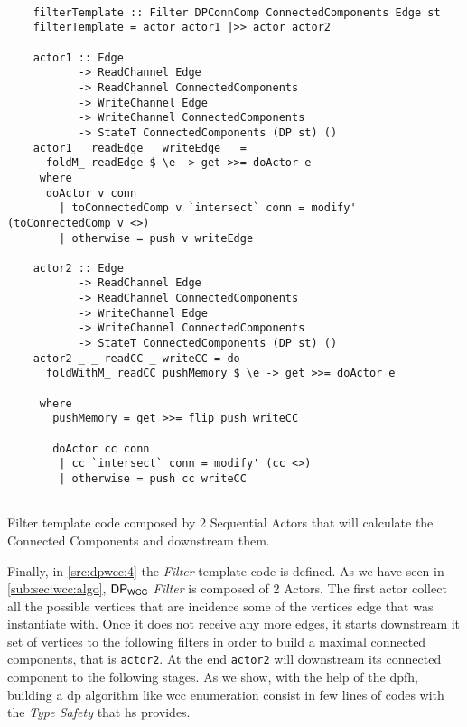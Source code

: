 \begin{listing}[H]
  \begin{verbatim}
    
    filterTemplate :: Filter DPConnComp ConnectedComponents Edge st
    filterTemplate = actor actor1 |>> actor actor2
    
    actor1 :: Edge
           -> ReadChannel Edge
           -> ReadChannel ConnectedComponents
           -> WriteChannel Edge
           -> WriteChannel ConnectedComponents
           -> StateT ConnectedComponents (DP st) ()
    actor1 _ readEdge _ writeEdge _ = 
      foldM_ readEdge $ \e -> get >>= doActor e
     where
      doActor v conn
        | toConnectedComp v `intersect` conn = modify' (toConnectedComp v <>)
        | otherwise = push v writeEdge
    
    actor2 :: Edge
           -> ReadChannel Edge
           -> ReadChannel ConnectedComponents
           -> WriteChannel Edge
           -> WriteChannel ConnectedComponents
           -> StateT ConnectedComponents (DP st) ()
    actor2 _ _ readCC _ writeCC = do 
      foldWithM_ readCC pushMemory $ \e -> get >>= doActor e
    
     where
       pushMemory = get >>= flip push writeCC
    
       doActor cc conn
        | cc `intersect` conn = modify' (cc <>)
        | otherwise = push cc writeCC
    
  \end{verbatim}
  \caption[{[\texttt{ConnectedComp.hs}] Filter Template Code}]{Filter template code composed by 2 Sequential Actors that will calculate the Connected Components and downstream them.}
  \label{src:dpwcc:4}
\end{listing}

Finally, in \autoref{src:dpwcc:4} the \textit{Filter} template code is defined. 
As we have seen in \autoref{sub:sec:wcc:algo}, $\mathsf{DP_{WCC}}$ \textit{Filter} is composed of 2 Actors. The first actor collect all the possible vertices that are incidence some of the vertices edge that was instantiate with.
Once it does not receive any more edges, it starts downstream it set of vertices to the following filters in order to build a maximal connected components, that is \texttt{actor2}. At the end \texttt{actor2} will downstream 
its connected component to the following stages.
As we show, with the help of the \acrlong{dpfh}, building a \acrshort{dp} algorithm like \acrshort{wcc} enumeration consist in few lines of codes with the \textit{Type Safety} that \acrshort{hs} provides.

